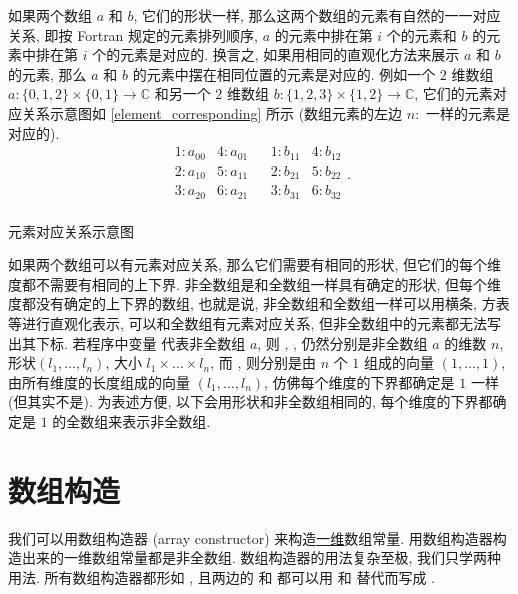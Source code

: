 如果两个数组 $a$ 和 $b$, 它们的形状一样, 那么这两个数组的元素有自然的一一对应关系, 即按 Fortran 规定的元素排列顺序, $a$ 的元素中排在第 $i$ 个的元素和 $b$ 的元素中排在第 $i$ 个的元素是对应的. 换言之, 如果用相同的直观化方法来展示 $a$ 和 $b$ 的元素, 那么 $a$ 和 $b$ 的元素中摆在相同位置的元素是对应的. 例如一个 $2$ 维数组 $a\colon \{0,1,2\}\times\{0,1\}\to\mathbb{C}$ 和另一个 $2$ 维数组 $b\colon \{1,2,3\}\times\{1,2\}\to\mathbb{C}$, 它们的元素对应关系示意图如 \ref{element_corresponding} 所示 (数组元素的左边 $n \colon$ 一样的元素是对应的).
\begin{equation}
    \begin{matrix}
        1 \colon a_{00}&4 \colon a_{01}&
        &1 \colon b_{11}&4 \colon b_{12}\\
        2 \colon a_{10}&5 \colon a_{11}&
        &2 \colon b_{21}&5 \colon b_{22}\\
        3 \colon a_{20}&6 \colon a_{21}&
        &3 \colon b_{31}&6 \colon b_{32}\\
    \end{matrix}.\label{element_corresponding}
\end{equation}
\begin{center}
    元素对应关系示意图
\end{center}

如果两个数组可以有元素对应关系, 那么它们需要有相同的形状, 但它们的每个维度都不需要有相同的上下界. 非全数组是和全数组一样具有确定的形状, 但每个维度都没有确定的上下界的数组, 也就是说, 非全数组和全数组一样可以用横条, 方表等进行直观化表示, 可以和全数组有元素对应关系, 但非全数组中的元素都无法写出其下标. 若程序中变量  代表非全数组 $a$, 则 , ,  仍然分别是非全数组 $a$ 的维数 $n$, 形状$(l_1,\dots,l_n)$, 大小 $l_1\times\dots\times l_n$, 而 ,  则分别是由 $n$ 个 $1$ 组成的向量 $(1,\dots,1)$, 由所有维度的长度组成的向量 $(l_1,\dots,l_n)$, 仿佛每个维度的下界都确定是 $1$ 一样 (但其实不是). 为表述方便, 以下会用形状和非全数组相同的, 每个维度的下界都确定是 $1$ 的全数组来表示非全数组.

\section{数组构造}\label{fortran_array_construction}

我们可以用数组构造器 (array constructor) 来构造\uline{一维}数组常量. 用数组构造器构造出来的一维数组常量都是非全数组. 数组构造器的用法复杂至极, 我们只学两种用法. 所有数组构造器都形如 \ttt{[...]}, 且两边的 \ttt{[} 和 \ttt{]} 都可以用 \ttt{(/} 和 \ttt{/)} 替代而写成 .

